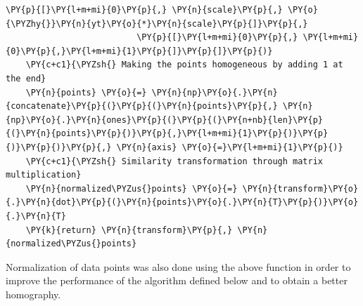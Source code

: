 \documentclass[a4paper,11pt]{article}%
\begin{document}
\begin{tcolorbox}[breakable, size=fbox, boxrule=1pt, pad at break*=1mm,colback=cellbackground, colframe=cellborder]
\begin{Verbatim}[commandchars=\\\{\}]
                          \PY{p}{[}\PY{l+m+mi}{0}\PY{p}{,} \PY{n}{scale}\PY{p}{,} \PY{o}{\PYZhy{}}\PY{n}{yt}\PY{o}{*}\PY{n}{scale}\PY{p}{]}\PY{p}{,}
                          \PY{p}{[}\PY{l+m+mi}{0}\PY{p}{,} \PY{l+m+mi}{0}\PY{p}{,}\PY{l+m+mi}{1}\PY{p}{]}\PY{p}{]}\PY{p}{)}
    \PY{c+c1}{\PYZsh{} Making the points homogeneous by adding 1 at the end}
    \PY{n}{points} \PY{o}{=} \PY{n}{np}\PY{o}{.}\PY{n}{concatenate}\PY{p}{(}\PY{p}{(}\PY{n}{points}\PY{p}{,} \PY{n}{np}\PY{o}{.}\PY{n}{ones}\PY{p}{(}\PY{p}{(}\PY{n+nb}{len}\PY{p}{(}\PY{n}{points}\PY{p}{)}\PY{p}{,}\PY{l+m+mi}{1}\PY{p}{)}\PY{p}{)}\PY{p}{)}\PY{p}{,} \PY{n}{axis} \PY{o}{=}\PY{l+m+mi}{1}\PY{p}{)}
    \PY{c+c1}{\PYZsh{} Similarity transformation through matrix multiplication}
    \PY{n}{normalized\PYZus{}points} \PY{o}{=} \PY{n}{transform}\PY{o}{.}\PY{n}{dot}\PY{p}{(}\PY{n}{points}\PY{o}{.}\PY{n}{T}\PY{p}{)}\PY{o}{.}\PY{n}{T}
    \PY{k}{return} \PY{n}{transform}\PY{p}{,} \PY{n}{normalized\PYZus{}points}
\end{Verbatim}
\end{tcolorbox}

Normalization of data points was also done using the above function in order to improve the performance of the algorithm defined below and to obtain a  better homography.\\ 
\end{document}
